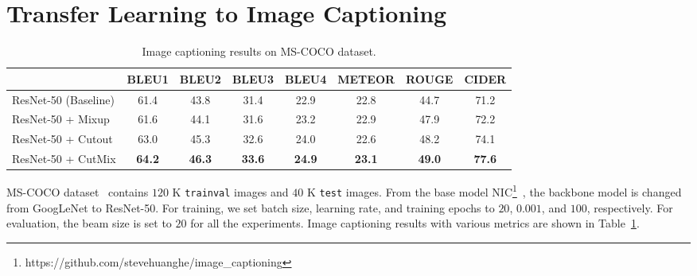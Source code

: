 \section{Transfer Learning to Image Captioning}
\label{appendix:captioning}

\begin{table}[]
\centering
\begin{tabular}{@{}lccccccc@{}}
\toprule
                     & BLEU1 & BLEU2 & BLEU3 & BLEU4 & METEOR & ROUGE & CIDER \\ \midrule
ResNet-50 (Baseline) & 61.4  & 43.8  & 31.4  & 22.9  & 22.8   & 44.7  & 71.2  \\
ResNet-50 + Mixup     & 61.6  & 44.1  & 31.6  & 23.2  & 22.9   & 47.9  & 72.2  \\
ResNet-50 + Cutout    & 63.0  & 45.3  & 32.6  & 24.0  & 22.6   & 48.2  & 74.1  \\
ResNet-50 + CutMix    & \textbf{64.2}  & \textbf{46.3}  & \textbf{33.6}  & \textbf{24.9}  & \textbf{23.1}   & \textbf{49.0}  & \textbf{77.6}  \\ \bottomrule
\end{tabular}
\caption{Image captioning results on MS-COCO dataset.}
\label{tab:sup:imagecap}
\end{table}

MS-COCO dataset~\cite{lin2014microsoft} contains $120$ K \texttt{trainval} images and $40$ K \texttt{test} images. 
From the base model NIC\footnote{https://github.com/stevehuanghe/image\_captioning}~\cite{vinyals2015show}, the backbone model is changed from GoogLeNet to ResNet-50. 
For training, we set batch size, learning rate, and training epochs to $20$, $0.001$, and $100$, respectively.
For evaluation, the beam size is set to $20$ for all the experiments.
Image captioning results with various metrics are shown in Table~\ref{tab:sup:imagecap}.
